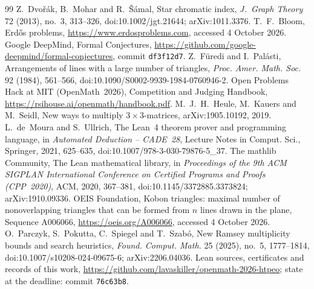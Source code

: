 \documentclass[11pt,a4paper]{article}
\theoremstyle{remark}
\begin{document}
\begin{thebibliography}{99}\small
{} Z.~Dvo\v{r}\'ak, B.~Mohar and R.~\v{S}\'amal, Star chromatic index, \emph{J.~Graph Theory} 72
(2013), no.~3, 313--326, doi:10.1002/jgt.21644; arXiv:1011.3376.
 T.~F.~Bloom, Erd\H{o}s problems, \url{https://www.erdosproblems.com}, accessed 4 October 2026.
 Google DeepMind, Formal Conjectures, \url{https://github.com/google-deepmind/formal-conjectures},
commit \texttt{df3f12d7}.
 Z.~F\"uredi and I.~Pal\'asti, Arrangements of lines with a large number of triangles, \emph{Proc.
Amer. Math. Soc.} 92 (1984), 561--566, doi:10.1090/S0002-9939-1984-0760946-2.
 Open Problems Hack at MIT (OpenMath~2026), Competition and Judging Handbook,
\url{https://rsihouse.ai/openmath/handbook.pdf}.
 M.~J.~H.~Heule, M.~Kauers and M.~Seidl, New ways to multiply $3\times3$-matrices, arXiv:1905.10192,
2019.
 L.~de~Moura and S.~Ullrich, The Lean~4 theorem prover and programming language, in \emph{Automated
Deduction -- CADE~28}, Lecture Notes in Comput. Sci., Springer, 2021, 625--635, doi:10.1007/978-3-030-79876-5\_37.
 The mathlib Community, The Lean mathematical library, in \emph{Proceedings of the 9th ACM SIGPLAN
International Conference on Certified Programs and Proofs (CPP~2020)}, ACM, 2020, 367--381,
doi:10.1145/3372885.3373824; arXiv:1910.09336.
 OEIS Foundation, Kobon triangles: maximal number of nonoverlapping triangles that can be formed from
$n$ lines drawn in the plane, Sequence A006066, \url{https://oeis.org/A006066}, accessed 4 October 2026.
 O.~Parczyk, S.~Pokutta, C.~Spiegel and T.~Szab\'o, New Ramsey multiplicity bounds and search
heuristics, \emph{Found. Comput. Math.} 25 (2025), no.~5, 1777--1814, doi:10.1007/s10208-024-09675-6; arXiv:2206.04036.
 Lean sources, certificates and records of this work,
\url{https://github.com/lavaskiller/openmath-2026-htpeo}; state at the deadline: commit \texttt{76c63b8}.
\end{thebibliography}
\end{document}
